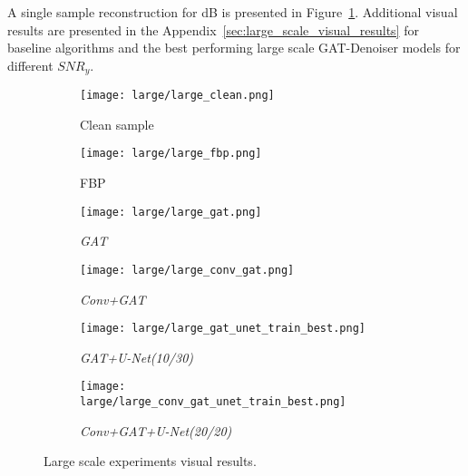 A single sample reconstruction for  dB is presented in Figure~\ref{fig:large_scale_best_reco}.
Additional visual results are presented in the Appendix~\ref{sec:large_scale_visual_results} for baseline algorithms 
and the best performing large scale GAT-Denoiser models for different $\textit{SNR}_y$. 

\begin{figure}[H]
  \captionsetup[subfigure]{justification=centering}
  \centering
  \begin{subfigure}[t]{0.16\textwidth}
    \texttt{[image: large/large\_clean.png]}
    \caption{Clean sample}
  \end{subfigure}
  \begin{subfigure}[t]{0.16\textwidth}
    \texttt{[image: large/large\_fbp.png]}
    \caption{FBP}
  \end{subfigure}
  \begin{subfigure}[t]{0.16\textwidth}
    \texttt{[image: large/large\_gat.png]}
    \caption{\textit{GAT}}
  \end{subfigure}
  \begin{subfigure}[t]{0.16\textwidth}
    \texttt{[image: large/large\_conv\_gat.png]}
    \caption{\textit{Conv+GAT}}
  \end{subfigure}
  \begin{subfigure}[t]{0.16\textwidth}
    \texttt{[image: large/large\_gat\_unet\_train\_best.png]}
    \caption{\textit{GAT+U-Net(10/30)}}
  \end{subfigure}
  \begin{subfigure}[t]{0.16\textwidth}
    \texttt{[image: large/large\_conv\_gat\_unet\_train\_best.png]}
    \caption{\textit{Conv+GAT+U-Net(20/20)}}
  \end{subfigure}
  \caption{Large scale experiments visual results.}
  \label{fig:large_scale_best_reco}
\end{figure}

